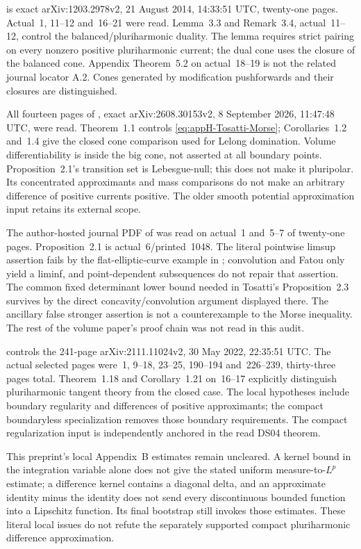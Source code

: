 \cite{FuXiao14ConesV2} is exact arXiv:1203.2978v2,
21 August 2014, 14:33:51 UTC, twenty-one pages. Actual~1, 11--12
and~16--21 were read. Lemma~3.3 and Remark~3.4, actual~11--12,
control the balanced/pluriharmonic duality. The lemma requires strict
pairing on every nonzero positive pluriharmonic current; the dual cone
uses the closure of the balanced cone. Appendix Theorem~5.2 on
actual~18--19 is not the related journal locator A.2. Cones generated
by modification pushforwards and their closures are distinguished.

All fourteen pages of \cite{Tosatti26MorseV2}, exact
arXiv:2608.30153v2, 8 September 2026, 11:47:48 UTC, were read.
Theorem~1.1 controls \eqref{eq:appH-Tosatti-Morse}; Corollaries~1.2
and~1.4 give the closed cone comparison used for Lelong domination.
Volume differentiability is inside the big cone, not asserted at all
boundary points. Proposition~2.1's transition set is Lebesgue-null;
this does not make it pluripolar. Its concentrated approximants and
mass comparisons do not make an arbitrary difference of positive
currents positive. The older smooth potential approximation input
retains its external scope.

The author-hosted journal PDF of \cite{Bou02b} was read on actual~1
and~5--7 of twenty-one pages. Proposition~2.1 is actual~6/printed~1048.
The literal pointwise limsup assertion fails by the flat-elliptic-curve
example in ; convolution and Fatou
only yield a liminf, and point-dependent subsequences do not repair
that assertion. The common fixed determinant lower bound needed in
Tosatti's Proposition~2.3 survives by the direct concavity/convolution
argument displayed there. The ancillary false stronger assertion is
not a counterexample to the Morse inequality. The rest of the volume
paper's proof chain was not read in this audit.

\cite{Nguyen22TangentsV2} controls the 241-page
arXiv:2111.11024v2, 30 May 2022, 22:35:51 UTC. The actual selected
pages were~1, 9--18, 23--25, 190--194 and~226--239, thirty-three
pages total. Theorem~1.18 and Corollary~1.21 on~16--17 explicitly
distinguish pluriharmonic tangent theory from the closed case.
The local hypotheses include boundary regularity and differences
of positive approximants; the compact boundaryless specialization
removes those boundary requirements. The compact regularization
input is independently anchored in the read DS04 theorem.

This preprint's local Appendix~B estimates remain uncleared. A kernel
bound in the integration variable alone does not give the stated
uniform measure-to-$L^p$ estimate; a difference kernel contains a
diagonal delta, and an approximate identity minus the identity does
not send every discontinuous bounded function into a Lipschitz
function. Its final bootstrap still invokes those estimates. These
literal local issues do not refute the separately supported compact
pluriharmonic difference approximation.

